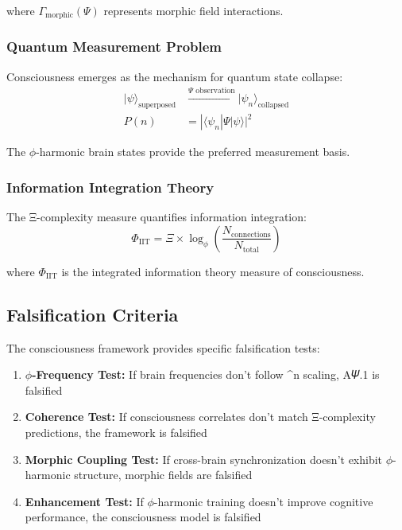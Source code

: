 where $\Gamma_{\text{morphic}}(𝛹)$ represents morphic field interactions.

\subsubsection{Quantum Measurement Problem}

Consciousness emerges as the mechanism for quantum state collapse:
\begin{align}
|\psi\rangle_{\text{superposed}} &\xrightarrow{𝛹 \text{ observation}} |\psi_n\rangle_{\text{collapsed}}\\
P(n) &= |\langle \psi_n | 𝛹 | \psi \rangle|^2
\end{align}

The $\phi$-harmonic brain states provide the preferred measurement basis.

\subsubsection{Information Integration Theory}

The Ξ-complexity measure quantifies information integration:
\begin{equation}
\Phi_{\text{IIT}} = \Xi \times \log_\phi\left(\frac{N_{\text{connections}}}{N_{\text{total}}}\right)
\end{equation}

where $\Phi_{\text{IIT}}$ is the integrated information theory measure of consciousness.

\subsection{Falsification Criteria}

The consciousness framework provides specific falsification tests:

\begin{enumerate}
\item \textbf{$\phi$-Frequency Test:} If brain frequencies don't follow \phi^n scaling, A𝛹.1 is falsified
\item \textbf{Coherence Test:} If consciousness correlates don't match Ξ-complexity predictions, the framework is falsified
\item \textbf{Morphic Coupling Test:} If cross-brain synchronization doesn't exhibit $\phi$-harmonic structure, morphic fields are falsified
\item \textbf{Enhancement Test:} If $\phi$-harmonic training doesn't improve cognitive performance, the consciousness model is falsified
\end{enumerate}

